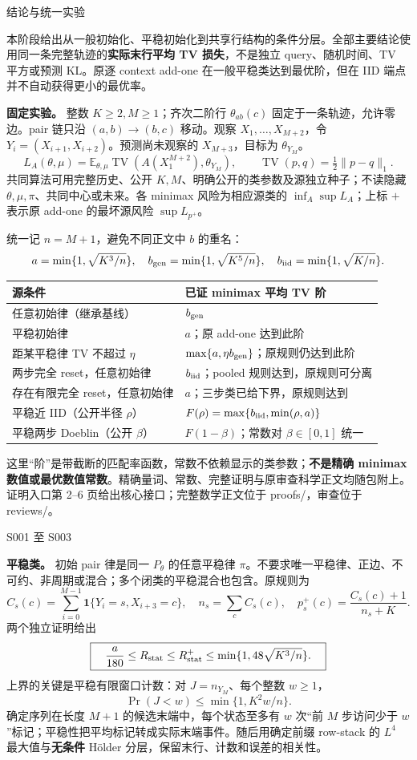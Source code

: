 \documentclass[11pt,a4paper]{article}
\renewcommand{\emph}[1]{\textbf{#1}}
\newcommand{\TV}{\operatorname{TV}}
\newcommand{\E}{\mathbb E}
\newcommand{\head}[2]{\begin{center}{\large\sffamily\color{ink}#1}\end{center}\vspace{-4pt}{\LARGE\bfseries #2}\par\vspace{5pt}}
\newcommand{\entry}[1]{\vfill\noindent\small\textcolor{ink}{证明入口}\quad#1\normalsize}
\begin{document}
\head{结论与统一实验}{数据条件改变统计率\quad{}算法未必自动受益}
本阶段给出从一般初始化、平稳初始化到共享行结构的条件分层。全部主要结论使用同一条完整轨迹的\textbf{实际末行平均 TV 损失}，不是独立 query、随机时间、TV 平方或预测 KL。原逐 context add-one 在一般平稳类达到最优阶，但在 IID 端点并不自动获得更小的最优率。

\textbf{固定实验。} 整数 $K\ge2,M\ge1$；齐次二阶行 $\theta_{ab}(c)$ 固定于一条轨迹，允许零边。pair 链只沿 $(a,b)\to(b,c)$ 移动。观察 $X_1,\ldots,X_{M+2}$，令 $Y_i=(X_{i+1},X_{i+2})$。预测尚未观察的 $X_{M+3}$，目标为 $\theta_{Y_M}$。
\[
 L_A(\theta,\mu)=\E_{\theta,\mu}\TV(A(X_1^{M+2}),\theta_{Y_M}),\qquad
 \TV(p,q)=\tfrac12\|p-q\|_1.
\]
共同算法可用完整历史、公开 $K,M$、明确公开的类参数及源独立种子；不读隐藏 $\theta,\mu,\pi$、共同中心或未来。各 minimax 风险为相应源类的 $\inf_A\sup L_A$；上标 $+$ 表示原 add-one 的最坏源风险 $\sup L_{p^+}$。

统一记 $n=M+1$，避免不同正文中 $b$ 的重名：
\[
 a=\min\{1,\sqrt{K^3/n}\},\quad
 b_{\rm gen}=\min\{1,\sqrt{K^5/n}\},\quad
 b_{\rm iid}=\min\{1,\sqrt{K/n}\}.
\]
\begin{tabularx}{\textwidth}{@{}p{}X@{}}\toprule
源条件 & 已证 minimax 平均 TV 阶\\\midrule
任意初始律（继承基线） & $b_{\rm gen}$\\
平稳初始律 & $a$；原 add-one 达到此阶\\
距某平稳律 TV 不超过 $\eta$ & $\max\{a,\eta b_{\rm gen}\}$；原规则仍达到此阶\\
两步完全 reset，任意初始律 & $b_{\rm iid}$；pooled 规则达到，原规则可分离\\
存在有限完全 reset，任意初始律 & $a$；三步类已给下界，原规则达到\\
平稳近 IID（公开半径 $\rho$） & $F(\rho)=\max\{b_{\rm iid},\min(\rho,a)\}$\\
平稳两步 Doeblin（公开 $\beta$） & $F(1-\beta)$；常数对 $\beta\in[0,1]$ 统一\\\bottomrule
\end{tabularx}

这里“阶”是带截断的匹配率函数，常数不依赖显示的类参数；\textbf{不是精确 minimax 数值或最优数值常数}。精确量词、常数、完整证明与原审查科学正文均随包附上。
\entry{第 2--6 页给出核心接口；完整数学正文位于 proofs/，审查位于 reviews/。}
\newpage
\head{S001 至 S003}{平稳收益及初始化距离代价}
\textbf{平稳类。} 初始 pair 律是同一 $P_\theta$ 的任意平稳律 $\pi$。不要求唯一平稳律、正边、不可约、非周期或混合；多个闭类的平稳混合也包含。原规则为
\[
 C_s(c)=\sum_{i=0}^{M-1}\mathbf1\{Y_i=s,X_{i+3}=c\},\quad
 n_s=\sum_c C_s(c),\quad p_s^+(c)=\frac{C_s(c)+1}{n_s+K}.
\]
两个独立证明给出
\[
 \boxed{\quad \frac{a}{180}\le R_{\rm stat}\le R^+_{\rm stat}
 \le \min\{1,48\sqrt{K^3/n}\}.\quad}
\]
上界的关键是平稳有限窗口计数：对 $J=n_{Y_M}$、每个整数 $w\ge1$，
\[
 \Pr(J<w)\le\min\{1,K^2w/n\}.
\]
确定序列在长度 $M+1$ 的候选末端中，每个状态至多有 $w$ 次“前 $M$ 步访问少于 $w$”标记；平稳性把平均标记转成实际末端事件。随后用确定前缀 row-stack 的 $L^4$ 最大值与\emph{无条件} Hölder 分层，保留末行、计数和误差的相关性。
\end{document}
